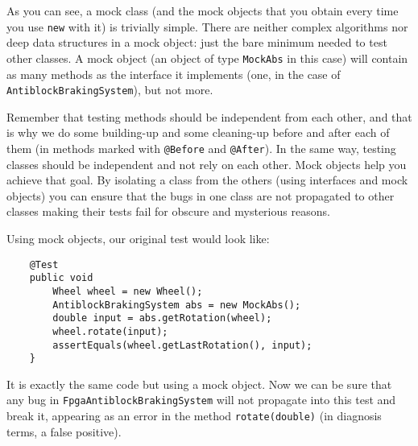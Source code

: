 As you can see, a mock class (and the mock objects that you obtain
every time you use \verb+new+ with it) is trivially simple. There are
neither complex algorithms nor deep data structures in a mock object:
just the bare minimum needed to test other classes. A mock object (an
object of type \verb+MockAbs+ in this case) will
contain as many methods as the interface it implements
(one, in the case of \verb+AntiblockBrakingSystem+), but not more. 

Remember that testing methods should be independent from each other,
and that is why we do some building-up and some cleaning-up before and
after each of them (in methods marked with \verb+@Before+ and
\verb+@After+). In the same way, testing classes should be independent
and not rely on each other. Mock objects help you achieve that goal. 
By isolating a class from the others (using interfaces and mock
objects) you can ensure that the bugs in one class are not propagated
to other classes making their tests fail for obscure and mysterious
reasons. 

Using mock objects, our original test would look like: 

\begin{verbatim}
    @Test
    public void 
        Wheel wheel = new Wheel();
        AntiblockBrakingSystem abs = new MockAbs();
        double input = abs.getRotation(wheel);
        wheel.rotate(input);
        assertEquals(wheel.getLastRotation(), input);
    }
\end{verbatim}

It is exactly the same code but using a mock object. Now we can be
sure that any bug in \verb+FpgaAntiblockBrakingSystem+ will not
propagate into this test and break it, appearing as an error in the
method \verb+rotate(double)+ (in diagnosis terms, a false positive).
